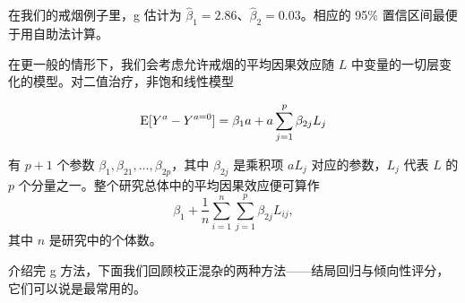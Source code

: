 在我们的戒烟例子里，g 估计为 $\hat\beta_1=2.86$、$\hat\beta_2=0.03$。相应的 95\% 置信区间最便于用自助法计算。


在更一般的情形下，我们会考虑允许戒烟的平均因果效应随 $L$ 中变量的一切层变化的模型。对二值治疗，非饱和线性模型

\[
\mathrm{E}[Y^a-Y^{a=0}]=\beta_1a+a\sum_{j=1}^{p}\beta_{2j}L_j
\]

有 $p+1$ 个参数 $\beta_1,\beta_{21},\dots,\beta_{2p}$，其中 $\beta_{2j}$ 是乘积项 $aL_j$ 对应的参数，$L_j$ 代表 $L$ 的 $p$ 个分量之一。整个研究总体中的平均因果效应便可算作
\[
\beta_1+\frac{1}{n}\sum_{i=1}^{n}\sum_{j=1}^{p}\beta_{2j}L_{ij},
\]
其中 $n$ 是研究中的个体数。

介绍完 g 方法，下面我们回顾校正混杂的两种方法——结局回归与倾向性评分，它们可以说是最常用的。

